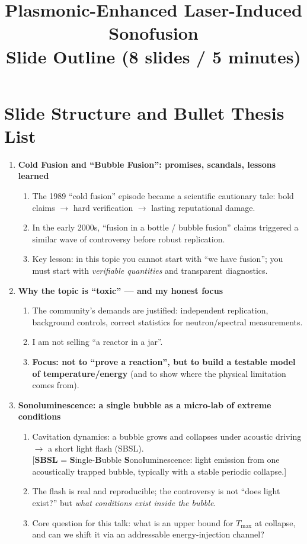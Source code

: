 \documentclass[11pt]{article}
\title{Plasmonic-Enhanced Laser-Induced Sonofusion\\Slide Outline (8 slides / 5 minutes)}
\author{}
\date{}
\begin{document}
	\maketitle
	
	\section*{Slide Structure and Bullet Thesis List}
	
	\begin{enumerate}
		
		\item \textbf{Cold Fusion and ``Bubble Fusion'': promises, scandals, lessons learned}
		\begin{enumerate}
			\item The 1989 ``cold fusion'' episode became a scientific cautionary tale: bold claims $\rightarrow$ hard verification $\rightarrow$ lasting reputational damage.
			\item In the early 2000s, ``fusion in a bottle / bubble fusion'' claims triggered a similar wave of controversy before robust replication.
			\item Key lesson: in this topic you cannot start with ``we have fusion''; you must start with \emph{verifiable quantities} and transparent diagnostics.
		\end{enumerate}
		
		\item \textbf{Why the topic is ``toxic'' --- and my honest focus}
		\begin{enumerate}
			\item The community's demands are justified: independent replication, background controls, correct statistics for neutron/spectral measurements.
			\item I am not selling ``a reactor in a jar''.
			\item \textbf{Focus: not to ``prove a reaction'', but to build a testable model of temperature/energy} (and to show where the physical limitation comes from).
		\end{enumerate}
		
		\item \textbf{Sonoluminescence: a single bubble as a micro-lab of extreme conditions}
		\begin{enumerate}
			\item Cavitation dynamics: a bubble grows and collapses under acoustic driving $\rightarrow$ a short light flash (SBSL).\\
			\hspace*{1.2em}[\textbf{SBSL} = \textbf{S}ingle-\textbf{B}ubble \textbf{S}ono\textbf{l}uminescence: light emission from one acoustically trapped bubble, typically with a stable periodic collapse.]
			\item The flash is real and reproducible; the controversy is not ``does light exist?'' but \emph{what conditions exist inside the bubble}.
			\item Core question for this talk: what is an upper bound for $T_{\max}$ at collapse, and can we shift it via an addressable energy-injection channel?
		\end{enumerate}
		

\end{enumerate}
\end{document}
